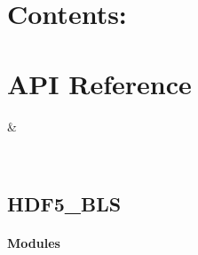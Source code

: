 \documentclass[letterpaper,10pt,english]{sphinxmanual}
\begin{document}
\begin{sphinxVerbatim}[commandchars=\\\{\}]

    

  \PYG{p}{[}\PYG{p}{]}
\end{sphinxVerbatim}


\chapter{Contents:}
\label{\detokenize{index:contents}}

\chapter{API Reference}
\label{\detokenize{index:api-reference}}

\begin{savenotes}\sphinxattablestart
\sphinxthistablewithglobalstyle
\sphinxthistablewithnovlinesstyle
\centering
\begin{tabulary}{\linewidth}[t]{}
\sphinxtoprule
\sphinxtableatstartofbodyhook
\sphinxAtStartPar
{\hyperref[\detokenize{_autosummary/HDF5_BLS:module-HDF5_BLS}]{}}
&
\sphinxAtStartPar

\\
\sphinxbottomrule
\end{tabulary}
\sphinxtableafterendhook\par
\sphinxattableend\end{savenotes}

\sphinxstepscope


\section{HDF5\_BLS}
\label{\detokenize{_autosummary/HDF5_BLS:module-HDF5_BLS}}\label{\detokenize{_autosummary/HDF5_BLS:hdf5-bls}}\label{\detokenize{_autosummary/HDF5_BLS::doc}}\subsubsection*{Modules}
\end{document}

